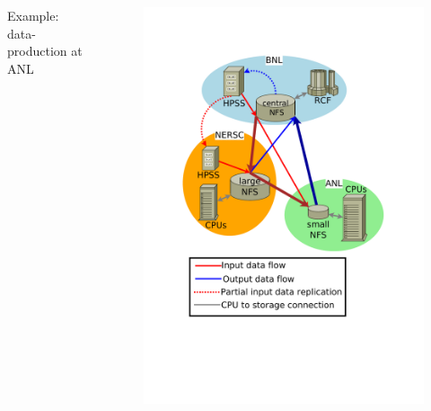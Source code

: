 \documentclass{beamer}
\begin{document}
\begin{frame}
\begin{columns}[c]
\begin{footnotesize}
\begin{block}{Example: data-production at ANL  \cite{Balewski}}
\begin{itemize}
		\end{itemize}
 	\end{block}
 	\end{footnotesize} 
		\begin{figure}
			\begin{center}
			    \vspace{-15mm}
				\includegraphics [width=1.2\textwidth]{pic/Data_production_schema_ANL2.pdf}
			\end{center}
			\end{figure} 	 	
 	\end{columns}
\end{frame}
\end{document}
